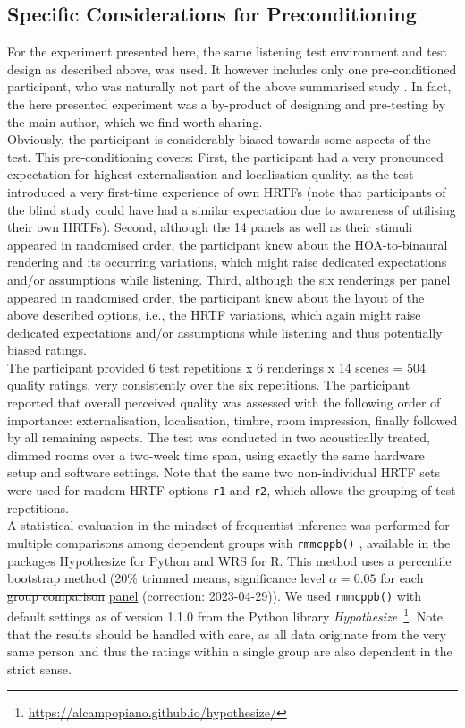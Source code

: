 \documentclass[conference]{IEEEtran}
\def\NewL{\\\noindent\hspace*{5mm}}
\begin{document}
\subsection{Specific Considerations for Preconditioning}
%
For the experiment presented here, the same listening test environment and test design as described above, was used.
%
It however includes only one pre-conditioned participant, who was naturally not part of the above summarised study \cite{Schultz2023_Acta}.
%
In fact, the here presented experiment was a by-product of designing and pre-testing by the main author, which we find worth sharing.
%
\NewL Obviously, the participant is considerably biased towards some aspects of the test.
%
This pre-conditioning covers:
%
First, the participant had a very pronounced expectation for highest externalisation and localisation quality, as the test introduced a very first-time experience of own HRTFs (note that participants of the blind study could have had a similar expectation due to awareness of utilising their own HRTFs).
%
Second, although the 14 panels as well as their stimuli appeared in randomised order, the participant knew about the HOA-to-binaural rendering and its occurring variations, which might raise dedicated expectations and/or assumptions while listening.
%
Third, although the six renderings per panel appeared in randomised order, the participant knew about the layout of the above described options, i.e., the HRTF variations, which again might raise dedicated expectations and/or assumptions while listening and thus potentially biased ratings.
%
\NewL The participant provided 6 test repetitions x 6 renderings x 14 scenes = 504 quality ratings, very consistently over the six repetitions.
%
The participant reported that overall perceived quality was assessed with the following order of importance: externalisation, localisation, timbre, room impression, finally followed by all remaining aspects.
%
The test was conducted in two acoustically treated, dimmed rooms over a two-week time span, using exactly the same hardware setup and software settings.
%
Note that the same two non-individual HRTF sets were used for random HRTF options \texttt{r1} and \texttt{r2}, which allows the grouping of test repetitions.
%
\NewL A statistical evaluation in the mindset of frequentist inference was performed for multiple comparisons among dependent groups with \verb|rmmcppb()| \cite[cf. Ch.~8.3.3]{Wilcox2022}, available in the packages Hypothesize for Python and WRS for R.
%
This method uses a percentile bootstrap method (20\% trimmed means, significance level $\alpha = 0.05$ for each \sout{group comparison} \underline{panel} (correction: 2023-04-29)).
%
We used \verb|rmmcppb()| with default settings as of version 1.1.0 from the Python library \textit{Hypothesize}~\cite{Campopiano2020_Hypothesize}\footnote{\url{https://alcampopiano.github.io/hypothesize/}}.
%
Note that the results should be handled with care, as all data originate from the very same person and thus the ratings within a single group are also dependent in the strict sense.
\end{document}
